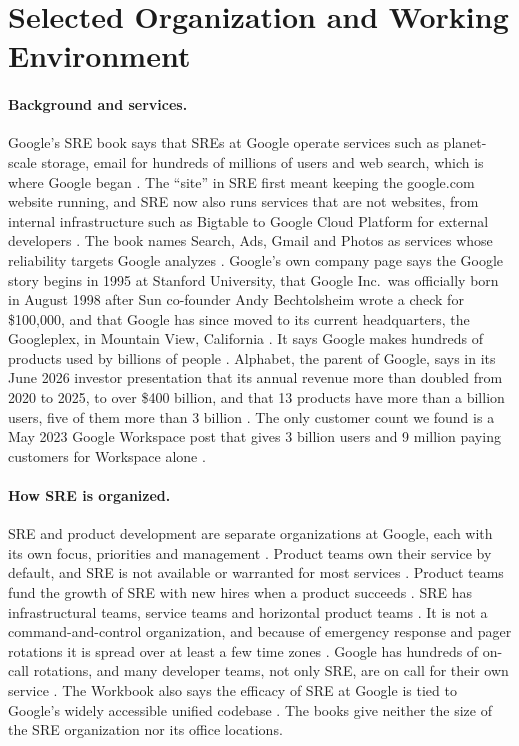 \section{Selected Organization and Working Environment}\label{sec:org}
\newcommand{\internad}{google-about-careers-applications-jobs-results-100028133205254854-software-engineering-site-reliability-engineering-bsms-intern-2027}

\paragraph{Background and services.}
Google's SRE book says that SREs at Google operate services such as planet-scale storage, email for hundreds of millions of users and web search, which is where Google began \cite{sre-book}. The ``site'' in SRE first meant keeping the google.com website running, and SRE now also runs services that are not websites, from internal infrastructure such as Bigtable to Google Cloud Platform for external developers \cite{sre-book}. The book names Search, Ads, Gmail and Photos as services whose reliability targets Google analyzes \cite{sre-book}. Google's own company page says the Google story begins in 1995 at Stanford University, that Google Inc.\ was officially born in August 1998 after Sun co-founder Andy Bechtolsheim wrote a check for \$100,000, and that Google has since moved to its current headquarters, the Googleplex, in Mountain View, California \cite{about-company-info-our-story}. It says Google makes hundreds of products used by billions of people \cite{about-company-info-our-story}. Alphabet, the parent of Google, says in its June 2026 investor presentation that its annual revenue more than doubled from 2020 to 2025, to over \$400 billion, and that 13 products have more than a billion users, five of them more than 3 billion \cite{blog-alphabet-investor-presentation-june-2026}. The only customer count we found is a May 2023 Google Workspace post that gives 3 billion users and 9 million paying customers for Workspace alone \cite{workspace-google-blog-product-announcements-workflows-across-workspace}.

\paragraph{How SRE is organized.}
SRE and product development are separate organizations at Google, each with its own focus, priorities and management \cite{workbook}. Product teams own their service by default, and SRE is not available or warranted for most services \cite{workbook}. Product teams fund the growth of SRE with new hires when a product succeeds \cite{workbook}. SRE has infrastructural teams, service teams and horizontal product teams \cite{sre-book}. It is not a command-and-control organization, and because of emergency response and pager rotations it is spread over at least a few time zones \cite{sre-book}. Google has hundreds of on-call rotations, and many developer teams, not only SRE, are on call for their own service \cite{workbook}. The Workbook also says the efficacy of SRE at Google is tied to Google's widely accessible unified codebase \cite{workbook}. The books give neither the size of the SRE organization nor its office locations.

